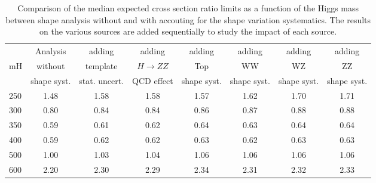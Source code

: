 \begin{table}[!ht]
\begin{center}
{\normalsize
\begin{tabular}{|l|c|cccccc|}
\hline
      &  Analysis    & adding          &  adding      &  adding      &  adding      & adding      & adding \\
mH  &  without     & template        &  $H\to ZZ$   &  Top         &  WW          & WZ          & ZZ \\
      &  shape syst. & stat. uncert.   &  QCD effect &  shape syst. &  shape syst. & shape syst. & shape syst. \\
\hline
250 & 1.48 & 1.58 & 1.58 & 1.57 & 1.62 & 1.70 & 1.71 \\
300 & 0.80 & 0.84 & 0.84 & 0.86 & 0.87 & 0.88 & 0.88 \\
350 & 0.59 & 0.61 & 0.62 & 0.64 & 0.63 & 0.64 & 0.64 \\
400 & 0.59 & 0.62 & 0.62 & 0.63 & 0.62 & 0.63 & 0.63 \\
500 & 1.00 & 1.03 & 1.04 & 1.06 & 1.06 & 1.06 & 1.06 \\
600 & 2.20 & 2.30 & 2.29 & 2.34 & 2.31 & 2.32 & 2.33 \\
\hline
\end{tabular}
}
\caption{Comparison of the median expected cross section ratio limits as a function 
of the Higgs mass between shape analysis without and with accouting for the 
shape variation systematics. The results on the various sources are added sequentially 
to study the impact of each source. }
\label{tab:mva_mtshape_detail}
\end{center}
\end{table}
